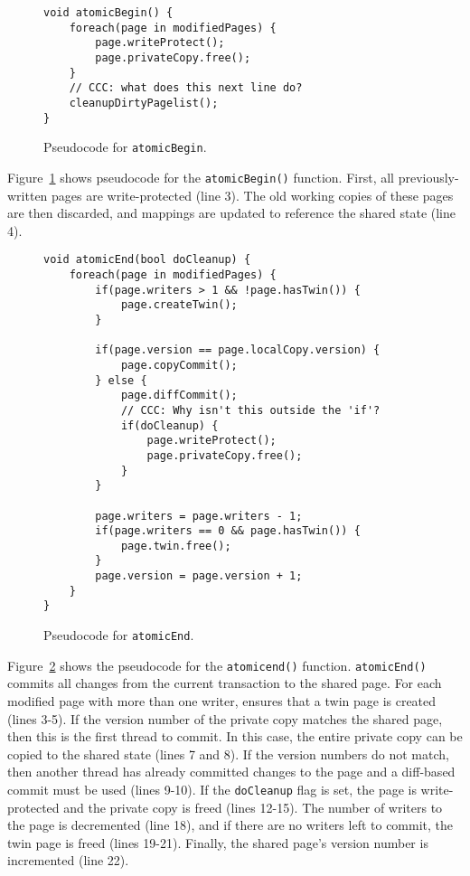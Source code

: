 \begin{figure}[!ht]
\begin{lstlisting}
void atomicBegin() {
	foreach(page in modifiedPages) {
		page.writeProtect();
		page.privateCopy.free();
	}
	// CCC: what does this next line do?
	cleanupDirtyPagelist(); 
}
\end{lstlisting}
\caption{Pseudocode for \texttt{atomicBegin}.\label{fig:atomicbegin}}
\end{figure}

\label{sec:atomicbegin}

Figure~\ref{fig:atomicbegin} shows pseudocode for the \texttt{atomicBegin()} function.   First, all previously-written pages are write-protected (line 3).  The old working copies of these pages are then discarded, and mappings are updated to reference the shared state (line 4).

\begin{figure}[!ht]
\begin{lstlisting}
void atomicEnd(bool doCleanup) {
	foreach(page in modifiedPages) {
		if(page.writers > 1 && !page.hasTwin()) {
			page.createTwin();
		}

		if(page.version == page.localCopy.version) {
			page.copyCommit();
		} else {
			page.diffCommit();
			// CCC: Why isn't this outside the 'if'?
			if(doCleanup) {
				page.writeProtect();
				page.privateCopy.free();
			}
		}

		page.writers = page.writers - 1;
		if(page.writers == 0 && page.hasTwin()) { 
			page.twin.free();
		}
		page.version = page.version + 1;
	}
}
\end{lstlisting}
\caption{Pseudocode for \texttt{atomicEnd}.\label{fig:atomicend}}
\end{figure}

Figure~\ref{fig:atomicend} shows the pseudocode for the \texttt{atomicend()} function.  \texttt{atomicEnd()} commits all changes from the current transaction to the shared page.  For each modified page with more than one writer, \dthreads{} ensures that a twin page is created (lines 3-5).  If the version number of the private copy matches the shared page, then this is the first thread to commit.  In this case, the entire private copy can be copied to the shared state (lines 7 and 8).  If the version numbers do not match, then another thread has already committed changes to the page and a diff-based commit must be used (lines 9-10).  If the \texttt{doCleanup} flag is set, the page is write-protected and the private copy is freed (lines 12-15).  The number of writers to the page is decremented (line 18), and if there are no writers left to commit, the twin page is freed (lines 19-21).  Finally, the shared page's version number is incremented (line 22).

